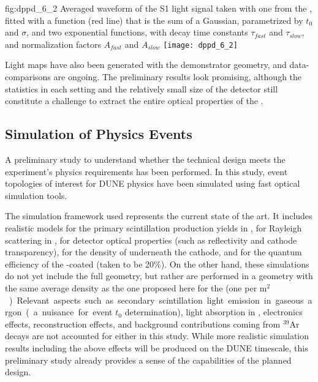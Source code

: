 \begin{dunefigure}{fig:dppd_6_2}
{Averaged waveform of the S1 light signal taken with one  from the  , fitted with a function (red line) that is the sum of a Gaussian, parametrized by $t_0$ and $\sigma$, and two exponential functions, with decay time constants $\tau_{fast}$ and $\tau_{slow}$, and normalization factors $A_{fast}$ and $A_{slow}$}
\texttt{[image: dppd\_6\_2]}
\end{dunefigure}

Light maps have also been generated with the demonstrator geometry, and data- comparisons are ongoing. The preliminary results look promising, although the statistics in each setting and the relatively small size of the detector still constitute a challenge to extract the entire optical properties of the \lar.


\subsection{Simulation of Physics Events}
\label{sec:fddp-pd-6.3}

A preliminary study to understand whether the \dual {} technical design meets the experiment's physics requirements has been performed. In this study, event topologies of interest for DUNE physics have been simulated using \larsoft fast optical simulation tools.

The simulation framework used represents the current state of the art. It includes realistic models for the primary scintillation production yields in \lar, for Rayleigh scattering in \lar, for detector optical properties (such as  reflectivity and cathode transparency), for the density of  underneath the cathode, and for the quantum efficiency of the -coated  (taken to be \num{20}\%). On the other hand, these simulations do not yet include the full  geometry, but rather are performed in a  geometry with the same average  density as the one proposed here for the  (one  per \si{m$^2$}). Relevant aspects such as secondary scintillation light emission in gaseous argon (a nuisance for event $t_0$ determination), light absorption in \lar, electronics effects, reconstruction effects, and background contributions coming from $^{39}$Ar decays are not accounted for either in this study. While more realistic simulation results including the above effects will be produced on the DUNE  timescale, this preliminary study already provides a sense of the capabilities of the planned  design.

